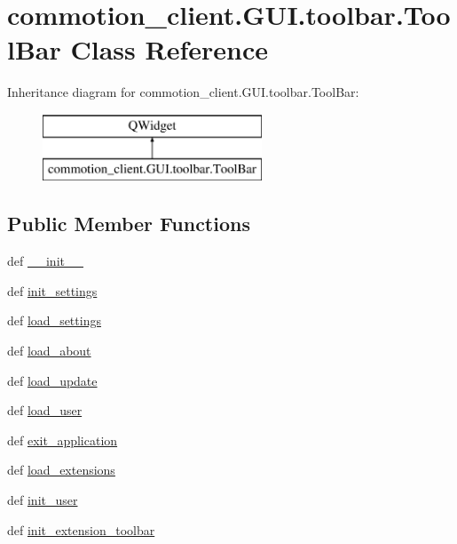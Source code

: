 \hypertarget{classcommotion__client_1_1GUI_1_1toolbar_1_1ToolBar}{\section{commotion\-\_\-client.\-G\-U\-I.\-toolbar.\-Tool\-Bar Class Reference}
\label{classcommotion__client_1_1GUI_1_1toolbar_1_1ToolBar}
}
Inheritance diagram for commotion\-\_\-client.\-G\-U\-I.\-toolbar.\-Tool\-Bar\-:\begin{figure}[H]
\begin{center}
\leavevmode
\includegraphics[height=2.000000cm]{classcommotion__client_1_1GUI_1_1toolbar_1_1ToolBar}
\end{center}
\end{figure}
\subsection*{Public Member Functions}
\begin{DoxyCompactItemize}
\item 
def \hyperlink{classcommotion__client_1_1GUI_1_1toolbar_1_1ToolBar_acea995f0bbf3a6e28c07b315e07b0af6}{\-\_\-\-\_\-init\-\_\-\-\_\-}
\item 
def \hyperlink{classcommotion__client_1_1GUI_1_1toolbar_1_1ToolBar_acb467ccaffdcd2c10fcce88a2d167079}{init\-\_\-settings}
\item 
def \hyperlink{classcommotion__client_1_1GUI_1_1toolbar_1_1ToolBar_a153dabe13871140e3d77226b986d8c37}{load\-\_\-settings}
\item 
def \hyperlink{classcommotion__client_1_1GUI_1_1toolbar_1_1ToolBar_a8fa89f6fa79c20123cdb74d3af3ecea5}{load\-\_\-about}
\item 
def \hyperlink{classcommotion__client_1_1GUI_1_1toolbar_1_1ToolBar_a186956c277f9ab85c6e1dcb73ec241ab}{load\-\_\-update}
\item 
def \hyperlink{classcommotion__client_1_1GUI_1_1toolbar_1_1ToolBar_a63bb48ec46de8e3982fb6e8ebcd05954}{load\-\_\-user}
\item 
def \hyperlink{classcommotion__client_1_1GUI_1_1toolbar_1_1ToolBar_ad0a0117438047cffdf421c9175c8e73a}{exit\-\_\-application}
\item 
def \hyperlink{classcommotion__client_1_1GUI_1_1toolbar_1_1ToolBar_a498f1b3352a8c1ee491921afb707fafa}{load\-\_\-extensions}
\item 
def \hyperlink{classcommotion__client_1_1GUI_1_1toolbar_1_1ToolBar_a232fde172cdeaf4c9c4b2dbc14a03cf3}{init\-\_\-user}
\item 
def \hyperlink{classcommotion__client_1_1GUI_1_1toolbar_1_1ToolBar_ad0e0bfc7e79a78a00253bebcc65c1a00}{init\-\_\-extension\-\_\-toolbar}
\end{DoxyCompactItemize}

